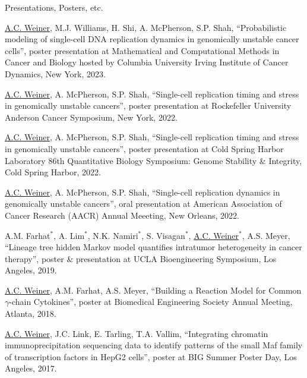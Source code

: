 \documentclass{resume} %
\begin{document}
\begin{rSection}{Presentations, Posters, etc.}

\underline{A.C. Weiner}, M.J. Williams, H. Shi, A. McPherson, S.P. Shah, ``Probabilistic modeling of single-cell DNA replication dynamics in genomically unstable cancer cells'', poster presentation at Mathematical and Computational Methods in Cancer and Biology hosted by Columbia University Irving Institute of Cancer Dynamics, New York, 2023.

\underline{A.C. Weiner}, A. McPherson, S.P. Shah, ``Single-cell replication timing and stress in genomically unstable cancers'', poster presentation at Rockefeller University Anderson Cancer Symposium, New York, 2022.

\underline{A.C. Weiner}, A. McPherson, S.P. Shah, ``Single-cell replication timing and stress in genomically unstable cancers'', poster presentation at Cold Spring Harbor Laboratory 86th Quantitative Biology Symposium: Genome Stability \& Integrity, Cold Spring Harbor, 2022.

\underline{A.C. Weiner}, A. McPherson, S.P. Shah, ``Single-cell replication dynamics in genomically unstable cancers'', oral presentation at American Association of Cancer Research (AACR) Annual Meeeting, New Orleans, 2022.

A.M. Farhat$^{\ast}$, A. Lim$^{\ast}$, N.K. Namiri$^{\ast}$, S. Visagan$^{\ast}$, \underline{A.C. Weiner$^{\ast}$}, A.S. Meyer, ``Lineage tree hidden Markov model quantifies intratumor heterogeneity in cancer therapy'', poster \& presentation at UCLA Bioengineering Symposium, Los Angeles, 2019.

\underline{A.C. Weiner}, A.M. Farhat, A.S. Meyer, ``Building a Reaction Model for Common $\gamma$-chain Cytokines'', poster at Biomedical Engineering Society Annual Meeting, Atlanta, 2018.

\underline{A.C. Weiner}, J.C. Link, E. Tarling, T.A. Vallim, ``Integrating chromatin immunoprecipitation sequencing data to identify patterns of the small Maf family of transcription factors in HepG2 cells'', poster at BIG Summer Poster Day, Los Angeles, 2017.

\end{rSection}

\end{document}
